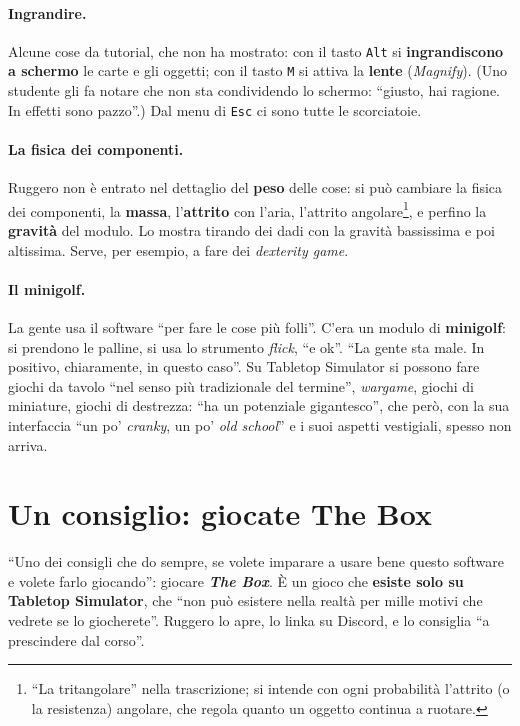\paragraph{Ingrandire.} Alcune cose da tutorial, che non ha mostrato: con il tasto
\texttt{Alt} si \textbf{ingrandiscono a schermo} le carte e gli oggetti; con il tasto
\texttt{M} si attiva la \textbf{lente} (\emph{Magnify}). (Uno studente gli fa notare
che non sta condividendo lo schermo: ``giusto, hai ragione. In effetti sono pazzo''.)
Dal menu di \texttt{Esc} ci sono tutte le scorciatoie.

\paragraph{La fisica dei componenti.} Ruggero non è entrato nel dettaglio del
\textbf{peso} delle cose: si può cambiare la fisica dei componenti, la \textbf{massa},
l'\textbf{attrito} con l'aria, l'attrito angolare\footnote{``La tritangolare'' nella
trascrizione; si intende con ogni probabilità l'attrito (o la resistenza) angolare,
che regola quanto un oggetto continua a ruotare.}, e perfino la \textbf{gravità} del
modulo. Lo mostra tirando dei dadi con la gravità bassissima e poi altissima. Serve,
per esempio, a fare dei \emph{dexterity game}.

\paragraph{Il minigolf.} La gente usa il software ``per fare le cose più folli''.
C'era un modulo di \textbf{minigolf}: si prendono le palline, si usa lo strumento
\emph{flick}, ``e ok''. ``La gente sta male. In positivo, chiaramente, in questo caso''.
Su Tabletop Simulator si possono fare giochi da tavolo ``nel senso più tradizionale del
termine'', \emph{wargame}, giochi di miniature, giochi di destrezza: ``ha un potenziale
gigantesco'', che però, con la sua interfaccia ``un po' \emph{cranky}, un po' \emph{old
school}'' e i suoi aspetti vestigiali, spesso non arriva.

\section{Un consiglio: giocate The Box}
\label{a8:sec:thebox}

``Uno dei consigli che do sempre, se volete imparare a usare bene questo software e
volete farlo giocando'': giocare \textbf{\emph{The Box}}. È un gioco che \textbf{esiste
solo su Tabletop Simulator}, che ``non può esistere nella realtà per mille motivi che
vedrete se lo giocherete''. Ruggero lo apre, lo linka su Discord, e lo consiglia ``a
prescindere dal corso''.


